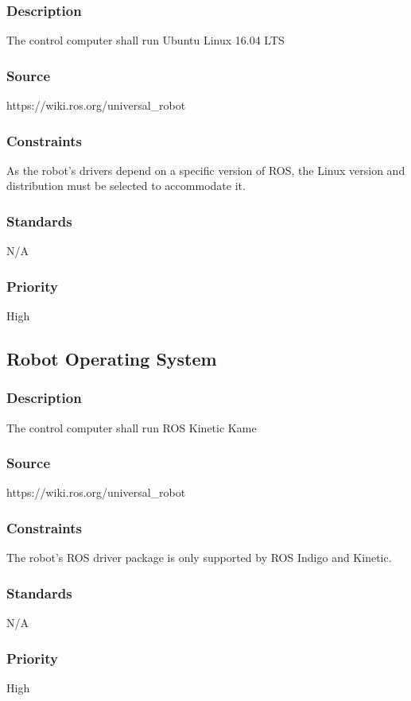\subsubsection{Description}
The control computer shall run Ubuntu Linux 16.04 LTS
\subsubsection{Source}
https://wiki.ros.org/universal\_robot
\subsubsection{Constraints}
As the robot's drivers depend on a specific version of ROS, the Linux version and distribution must be selected to accommodate it.
\subsubsection{Standards}
N/A
\subsubsection{Priority}
High

\subsection{Robot Operating System}
\subsubsection{Description}
The control computer shall run ROS Kinetic Kame
\subsubsection{Source}
https://wiki.ros.org/universal\_robot
\subsubsection{Constraints}
The robot's ROS driver package is only supported by ROS Indigo and Kinetic. %
\subsubsection{Standards}
N/A
\subsubsection{Priority}
High